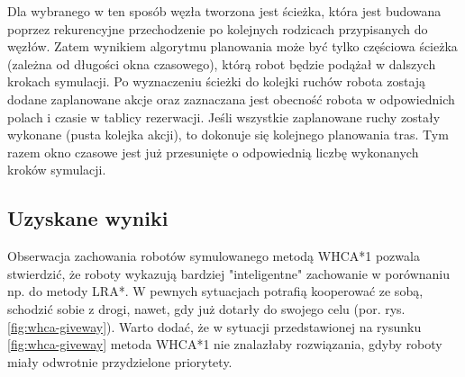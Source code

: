 Dla wybranego w ten sposób węzła tworzona jest ścieżka, która jest budowana poprzez rekurencyjne przechodzenie po kolejnych rodzicach przypisanych do węzłów.
Zatem wynikiem algorytmu planowania może być tylko częściowa ścieżka (zależna od długości okna czasowego), którą robot będzie podążał w dalszych krokach symulacji.
Po wyznaczeniu ścieżki do kolejki ruchów robota zostają dodane zaplanowane akcje oraz zaznaczana jest obecność robota w odpowiednich polach i czasie w tablicy rezerwacji.
Jeśli wszystkie zaplanowane ruchy zostały wykonane (pusta kolejka akcji), to dokonuje się kolejnego planowania tras.
Tym razem okno czasowe jest już przesunięte o odpowiednią liczbę wykonanych kroków symulacji.

\subsection{Uzyskane wyniki}
Obserwacja zachowania robotów symulowanego metodą WHCA*1 pozwala stwierdzić, że roboty wykazują bardziej "inteligentne" zachowanie w porównaniu np. do metody LRA*.
W pewnych sytuacjach potrafią kooperować ze sobą, schodzić sobie z drogi, nawet, gdy już dotarły do swojego celu (por. rys. \ref{fig:whca-giveway}).
Warto dodać, że w sytuacji przedstawionej na rysunku \ref{fig:whca-giveway} metoda WHCA*1 nie znalazłaby rozwiązania, gdyby roboty miały odwrotnie przydzielone priorytety.
